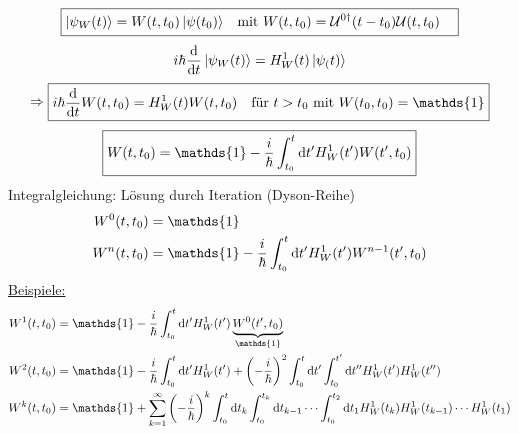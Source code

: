 		\begin{align*}
		\boxed{	
		\begin{aligned}
			\ket{\psi_W(t)} &= W(t,t_0) \ket{\psi(t_0)} &\text{mit~} W(t,t_0) &= \mathcal{U}^{0\dagger} (t-t_0) \mathcal{U} (t,t_0) 
		\end{aligned}
		}
		\end{align*}
		\begin{equation*}
			i \hbar \frac{\mathrm{d}}{\mathrm{d} t} \ket{\psi_W(t)} = H^1_W(t) \ket{\psi_(t)}
		\end{equation*}	
		\begin{align*}
		\Rightarrow
		\boxed{	
			\begin{aligned}
				i \hbar \frac{\diff}{\diff t} W(t,t_0) 
				&= H^1_W(t) W(t,t_0) &\text{für~} t>t_0 \text{~mit~} W(t_0,t_0) = \mathds{1}
			\end{aligned}
		}
		\end{align*}
		\begin{equation*}
			\boxed{ W(t,t_0) = \mathds{1} 
				- \frac{i}{\hbar} \int_{t_0}^{t} \diff t' H^1_W(t') W(t',t_0)
				}
		\end{equation*}
	Integralgleichung: Lösung durch Iteration (Dyson-Reihe)
		\begin{align*}
			W^0(t,t_0) &= \mathds{1} \\
			W^n(t,t_0) &= \mathds{1} - \frac{i}{\hbar} \int_{t_0}^{t} \diff t' H^1_W(t') W^{n-1}(t',t_0)
		\end{align*}
	\underline{Beispiele:}
		\begin{align*}
			W^1(t,t_0) &= \mathds{1}
			- \frac{i}{\hbar} \int_{t_0}^{t} \diff t' H^1_W(t') \underbrace{W^{0}(t',t_0)}_{\substack{\mathds{1}}} \\
			W^2(t,t_0) &= \mathds{1} 
			- \frac{i}{\hbar} \int_{t_0}^{t} \diff t' H^1_W(t')
			+ \left( -\frac{i}{\hbar}\right)^2 \int_{t_0}^{t} \diff t' \int_{t_0}^{t'} \diff t'' H^1_W(t') H^1_W(t'') \\
			W^k(t,t_0) &= \mathds{1} 
			+ \sum_{k=1}^{\infty} \left(-\frac{i}{\hbar}\right)^k 
			\int_{t_0}^{t} \diff t_k
			\int_{t_0}^{t_k} \diff t_{k-1} \cdots 
			\int_{t_0}^{t_2} \diff t_1 H^1_W(t_k) H^1_W(t_{k-1}) \cdots H^1_W(t_1)
		\end{align*}